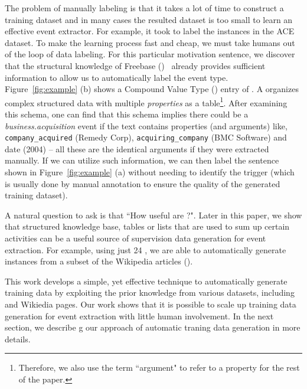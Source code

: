 
The problem of manually labeling is that it takes a lot of time to construct a training dataset and in many cases the resulted dataset is
too small to learn an effective event extractor. For example, it took  to label the  instances in the ACE
dataset. To make the learning process fast and cheap, we must take humans out of the loop of data labeling.  For this particular motivation
sentence, we discover that the structural knowledge of Freebase (\FB)~\cite{bollacker2008freebase} already provides sufficient information
to allow us to automatically label the event type. Figure~\ref{fig:example} (b) shows a Compound Value Type (\CVT) entry of \FB. A \CVT
organizes complex structured data with multiple \emph{properties} as a table\footnote{Therefore, we also use the term ``argument" to refer
to a \CVT property for the rest of the paper.}. After examining this \CVT schema, one can find that this schema implies there could be a
\emph{business.acquisition} event if the text contains properties (and arguments) like, \texttt{company\_acquired} (Remedy Corp),
\texttt{acquiring\_company} (BMC Software) and date (2004) -- all these are the identical arguments if they were extracted manually. If we
can utilize such \CVT information, we can then label the sentence shown in Figure~\ref{fig:example} (a) without needing to identify the
trigger (which is usually done by manual annotation to ensure the quality of the generated training dataset).


A natural question to ask is that ``How useful are \CVTs?". Later in this paper, we show that structured knowledge base, tables or lists
that are used to sum up certain activities can be a useful source of supervision data generation for event extraction. For example, using
just 24 \CVTs, we are able to automatically generate   instances from a subset of the Wikipedia
articles ().


This work develops a simple, yet effective technique to automatically generate training data by exploiting the prior \CVT knowledge from
various datasets, including \FB and Wikiedia pages. Our work shows that it is possible to scale up training data generation for event
extraction with little human involvement. In the next section, we describe g our approach of automatic traning data generation in more
details.


